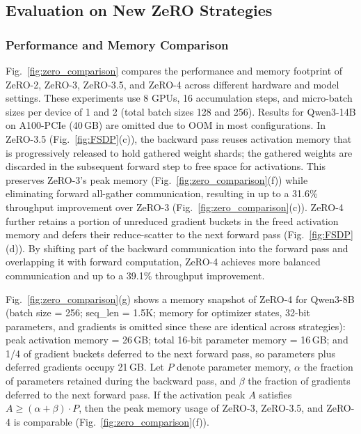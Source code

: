 \documentclass[letterpaper,twocolumn,10pt]{article}
\begin{document}
\subsection{Evaluation on New ZeRO Strategies}
\label{sec:exp_zeros}

\subsubsection{Performance and Memory Comparison}
\label{sec:zero_performance}

Fig.~\ref{fig:zero_comparison} compares the performance and memory footprint of ZeRO-2, ZeRO-3, ZeRO-3.5, and ZeRO-4 across different hardware and model settings. These experiments use 8 GPUs, 16 accumulation steps, and micro-batch sizes per device of 1 and 2 (total batch sizes 128 and 256). Results for Qwen3-14B on A100-PCIe (40\,GB) are omitted due to OOM in most configurations. In ZeRO-3.5 (Fig.~\ref{fig:FSDP}(c)), the backward pass reuses activation memory that is progressively released to hold gathered weight shards; the gathered weights are discarded in the subsequent forward step to free space for activations. This preserves ZeRO-3's peak memory (Fig.~\ref{fig:zero_comparison}(f)) while eliminating forward all-gather communication, resulting in up to a 31.6\% throughput improvement over ZeRO-3 (Fig.~\ref{fig:zero_comparison}(c)). ZeRO-4 further retains a portion of unreduced gradient buckets in the freed activation memory and defers their reduce-scatter to the next forward pass (Fig.~\ref{fig:FSDP}(d)). By shifting part of the backward communication into the forward pass and overlapping it with forward computation, ZeRO-4 achieves more balanced communication and up to a 39.1\% throughput improvement.

Fig.~\ref{fig:zero_comparison}(g) shows a memory snapshot of ZeRO-4 for Qwen3-8B (batch size = 256; seq\_len = 1.5K; memory for optimizer states, 32-bit parameters, and gradients is omitted since these are identical across strategies): peak activation memory = 26\,GB; total 16-bit parameter memory = 16\,GB; and 1/4 of gradient buckets deferred to the next forward pass, so parameters plus deferred gradients occupy 21\,GB. Let $P$ denote parameter memory, $\alpha$ the fraction of parameters retained during the backward pass, and $\beta$ the fraction of gradients deferred to the next forward pass. If the activation peak $A$ satisfies $A \ge (\alpha+\beta)\cdot P$, then the peak memory usage of ZeRO-3, ZeRO-3.5, and ZeRO-4 is comparable (Fig.~\ref{fig:zero_comparison}(f)). 
\end{document}

